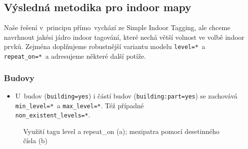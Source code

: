 \subsection{Výsledná metodika pro indoor mapy}\label{vuxfdslednuxe1-metodika-pro-indoor-mapy}

Naše řešení v~principu přímo~vychází ze Simple Indoor Tagging, ale chceme navrhnout jakési jádro indoor tagování, které nechá větší volnost ve volbě indoor prvků. Zejména doplňujeme robustnější variantu modelu \texttt{level=*}~a \texttt{repeat\_on=*}~a adresujeme některé další potíže.

\subsubsection*{Budovy}\label{budovy}

\begin{itemize}

\item
  U~budov (\texttt{building=yes}) i částí budov (\texttt{building:part=yes}) se zachovává \texttt{min\_level=*}~a \texttt{max\_level=*}. Též případné \\ \texttt{non\_existent\_levels=*}.
\end{itemize}



                      \begin{figure}
                    
                    \hfill

                    \caption{Využití tagu level a repeat\_on (a); mezipatra pomocí desetinného čísla (b)}
                    \label{obr29}
                    \end{figure}
                    

